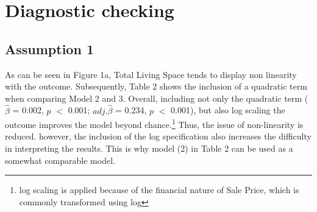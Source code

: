 \documentclass[a4paper]{article}
\begin{document}
\section{Diagnostic checking}
\subsection{Assumption 1}
As can be seen in Figure 1a, Total Living Space tends to display non linearity with the outcome. Subsequently, Table 2 shows the inclusion of a quadratic term when comparing Model 2 and 3. Overall, including not only the quadratic term ($\hat{\beta}$ = 0.002, $p$ $<$ 0.001; $adj.\hat{\beta}$ = 0.234, $p$ $<$ 0.001), but also log scaling the outcome improves the model beyond chance.\footnote{log scaling is applied because of the financial nature of Sale Price, which is commonly transformed using log} Thus, the issue of non-linearity is reduced. however, the inclusion of the log specification also increases the difficulty in interpreting the results. This is why model (2) in Table 2 can be used as a somewhat comparable model. 
\end{document}
